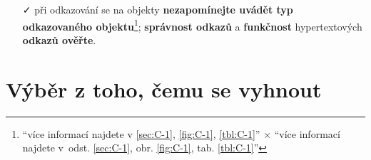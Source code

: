 \documentclass[a4paper,11pt, twoside]{report}
\begin{document}
\begin{itemize}
\item[\faCheck] při odkazování se na objekty \textbf{nezapomínejte uvádět typ odkazovaného objektu}\footnote{``více informací najdete v \ref{sec:C-1},
\ref{fig:C-1},
\ref{tbl:C-1}''
$\times$
``více informací najdete v~odst. \ref{sec:C-1},
obr. \ref{fig:C-1},
tab. \ref{tbl:C-1}''}; 
\textbf{správnost odkazů}
a \textbf{funkčnost} hypertextových \textbf{odkazů ověřte}.


\end{itemize}

\pagebreak


\raggedbottom


\parbox{\textwidth}{
\centering 

\scalebox{2.5}{

\faClose
}}


\section*{Výběr z toho, čemu se vyhnout}


\raggedbottom
\end{document}
